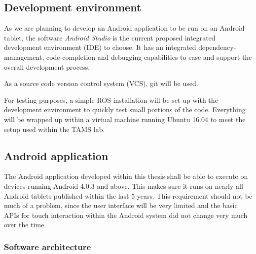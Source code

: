 \documentclass[a4paper]{article}
\begin{document}
\subsection{Development environment}

As we are planning to develop an Android application to be run on an Android tablet, the software \textit{Android Studio} is the current proposed integrated development environment (IDE) to choose. It has an integrated dependency-management, code-completion and debugging capabilities to ease and support the overall development process.

As a source code version control system (VCS), git will be used.

For testing purposes, a simple ROS installation will be set up with the development environment to quickly test small portions of the code. Everything will be wrapped up within a virtual machine running Ubuntu 16.04 to meet the setup used within the TAMS lab.

\subsection{Android application}

The Android application developed within this thesis shall be able to execute on devices running Android 4.0.3 and above. This makes sure it runs on nearly all Android tablets published within the last 5 years. This requirement should not be much of a problem, since the user interface will be very limited and the basic APIs for touch interaction within the Android system did not change very much over the time. 

\subsubsection{Software architecture}
\end{document}
